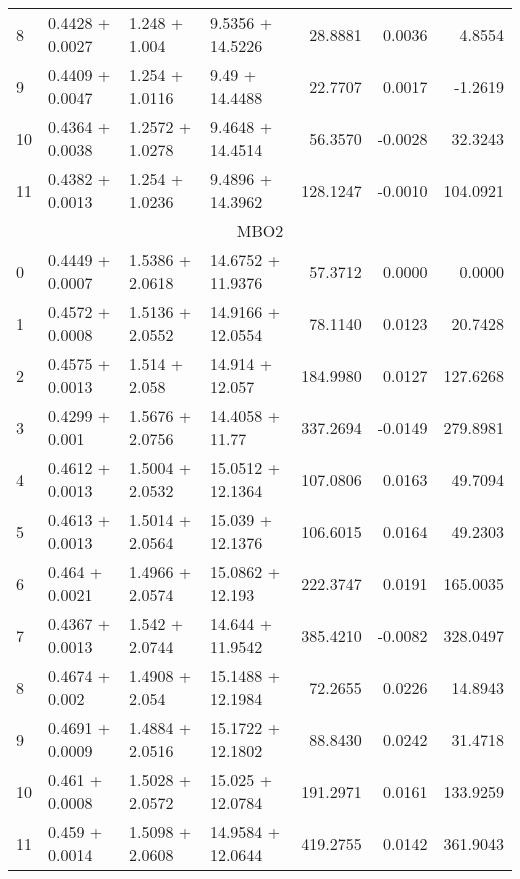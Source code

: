 \begin{tabular}{llllrrr}
  8  &  0.4428 + 0.0027 &    1.248 + 1.004 &  9.5356 + 14.5226 &             28.8881 &                 0.0036 &         4.8554 \\
  9  &  0.4409 + 0.0047 &   1.254 + 1.0116 &    9.49 + 14.4488 &             22.7707 &                 0.0017 &        -1.2619 \\
  10 &  0.4364 + 0.0038 &  1.2572 + 1.0278 &  9.4648 + 14.4514 &             56.3570 &                -0.0028 &        32.3243 \\
  11 &  0.4382 + 0.0013 &   1.254 + 1.0236 &  9.4896 + 14.3962 &            128.1247 &                -0.0010 &       104.0921 \\
  \midrule
  \multicolumn{7}{c}{MBO2} \\
  \midrule
  0  &  0.4449 + 0.0007 &  1.5386 + 2.0618 &  14.6752 + 11.9376 &             57.3712 &                 0.0000 &         0.0000 \\
  1  &  0.4572 + 0.0008 &  1.5136 + 2.0552 &  14.9166 + 12.0554 &             78.1140 &                 0.0123 &        20.7428 \\
  2  &  0.4575 + 0.0013 &    1.514 + 2.058 &    14.914 + 12.057 &            184.9980 &                 0.0127 &       127.6268 \\
  3  &   0.4299 + 0.001 &  1.5676 + 2.0756 &    14.4058 + 11.77 &            337.2694 &                -0.0149 &       279.8981 \\
  4  &  0.4612 + 0.0013 &  1.5004 + 2.0532 &  15.0512 + 12.1364 &            107.0806 &                 0.0163 &        49.7094 \\
  5  &  0.4613 + 0.0013 &  1.5014 + 2.0564 &   15.039 + 12.1376 &            106.6015 &                 0.0164 &        49.2303 \\
  6  &   0.464 + 0.0021 &  1.4966 + 2.0574 &   15.0862 + 12.193 &            222.3747 &                 0.0191 &       165.0035 \\
  7  &  0.4367 + 0.0013 &   1.542 + 2.0744 &   14.644 + 11.9542 &            385.4210 &                -0.0082 &       328.0497 \\
  8  &   0.4674 + 0.002 &   1.4908 + 2.054 &  15.1488 + 12.1984 &             72.2655 &                 0.0226 &        14.8943 \\
  9  &  0.4691 + 0.0009 &  1.4884 + 2.0516 &  15.1722 + 12.1802 &             88.8430 &                 0.0242 &        31.4718 \\
  10 &   0.461 + 0.0008 &  1.5028 + 2.0572 &   15.025 + 12.0784 &            191.2971 &                 0.0161 &       133.9259 \\
  11 &   0.459 + 0.0014 &  1.5098 + 2.0608 &  14.9584 + 12.0644 &            419.2755 &                 0.0142 &       361.9043 \\
  \bottomrule
  \end{tabular}
  